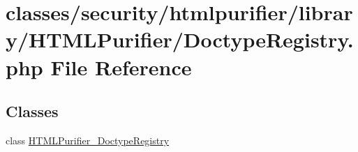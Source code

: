\hypertarget{DoctypeRegistry_8php}{\section{classes/security/htmlpurifier/library/\+H\+T\+M\+L\+Purifier/\+Doctype\+Registry.php File Reference}
\label{DoctypeRegistry_8php}
}
\subsection*{Classes}
\begin{DoxyCompactItemize}
\item 
class \hyperlink{classHTMLPurifier__DoctypeRegistry}{H\+T\+M\+L\+Purifier\+\_\+\+Doctype\+Registry}
\end{DoxyCompactItemize}
